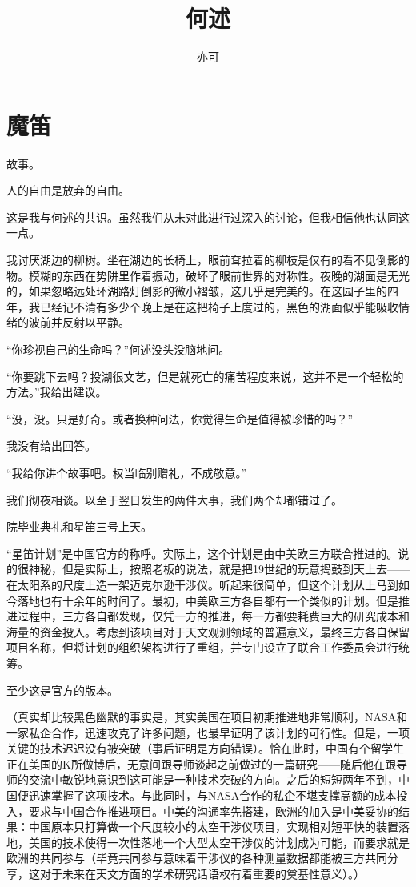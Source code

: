 \documentclass[a4paper, 10pt]{article}
\begin{document}
\title{{\huge \textbf {何述}}}
  \author{亦可}
  \maketitle

\section{魔笛}
故事。

人的自由是放弃的自由。

这是我与何述的共识。虽然我们从未对此进行过深入的讨论，但我相信他也认同这一点。

我讨厌湖边的柳树。坐在湖边的长椅上，眼前耷拉着的柳枝是仅有的看不见倒影的物。模糊的东西在势阱里作着振动，破坏了眼前世界的对称性。夜晚的湖面是无光的，如果忽略远处环湖路灯倒影的微小褶皱，这几乎是完美的。在这园子里的四年，我已经记不清有多少个晚上是在这把椅子上度过的，黑色的湖面似乎能吸收情绪的波前并反射以平静。

“你珍视自己的生命吗？”何述没头没脑地问。

“你要跳下去吗？投湖很文艺，但是就死亡的痛苦程度来说，这并不是一个轻松的方法。”我给出建议。

“没，没。只是好奇。或者换种问法，你觉得生命是值得被珍惜的吗？”

我没有给出回答。

“我给你讲个故事吧。权当临别赠礼，不成敬意。”
    
我们彻夜相谈。以至于翌日发生的两件大事，我们两个却都错过了。
    
院毕业典礼和星笛三号上天。

    
“星笛计划”是中国官方的称呼。实际上，这个计划是由中美欧三方联合推进的。说的很神秘，但是实际上，按照老板的说法，就是把19世纪的玩意捣鼓到天上去——在太阳系的尺度上造一架迈克尔逊干涉仪。听起来很简单，但这个计划从上马到如今落地也有十余年的时间了。最初，中美欧三方各自都有一个类似的计划。但是推进过程中，三方各自都发现，仅凭一方的推进，每一方都要耗费巨大的研究成本和海量的资金投入。考虑到该项目对于天文观测领域的普遍意义，最终三方各自保留项目名称，但将计划的组织架构进行了重组，并专门设立了联合工作委员会进行统筹。
    
至少这是官方的版本。
    
（真实却比较黑色幽默的事实是，其实美国在项目初期推进地非常顺利，NASA和一家私企合作，迅速攻克了许多问题，也最早证明了该计划的可行性。但是，一项关键的技术迟迟没有被突破（事后证明是方向错误）。恰在此时，中国有个留学生正在美国的K所做博后，无意间跟导师谈起之前做过的一篇研究——随后他在跟导师的交流中敏锐地意识到这可能是一种技术突破的方向。之后的短短两年不到，中国便迅速掌握了这项技术。与此同时，与NASA合作的私企不堪支撑高额的成本投入，要求与中国合作推进项目。中美的沟通率先搭建，欧洲的加入是中美妥协的结果：中国原本只打算做一个尺度较小的太空干涉仪项目，实现相对短平快的装置落地，美国的技术使得一次性落地一个大型太空干涉仪的计划成为可能，而要求就是欧洲的共同参与（毕竟共同参与意味着干涉仪的各种测量数据都能被三方共同分享，这对于未来在天文方面的学术研究话语权有着重要的奠基性意义）。）
    
\end{document}
